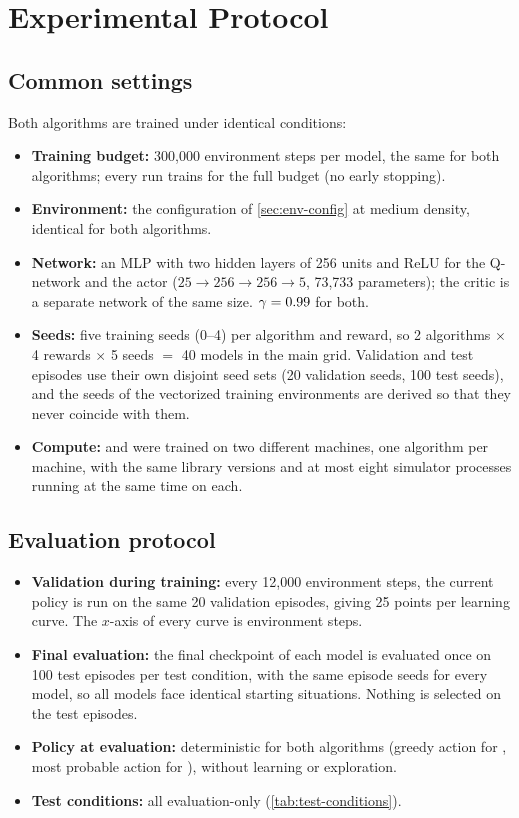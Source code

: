 \section{Experimental Protocol}\label{sec:protocol}

\subsection{Common settings}
Both algorithms are trained under identical conditions:
\begin{itemize}
  \item \textbf{Training budget:} 300,000 environment steps per model, the same for both algorithms; every run trains
        for the full budget (no early stopping).
  \item \textbf{Environment:} the configuration of \cref{sec:env-config} at medium density, identical for both
        algorithms.
  \item \textbf{Network:} an MLP with two hidden layers of 256 units and ReLU for the \ddqn{} Q-network and the \ppo{}
        actor ($25 \to 256 \to 256 \to 5$, 73,733 parameters); the \ppo{} critic is a separate network of the same size.
        $\gamma = 0.99$ for both.
  \item \textbf{Seeds:} five training seeds (0--4) per algorithm and reward, so 2 algorithms $\times$ 4 rewards
        $\times$ 5 seeds $=$ 40 models in the main grid. Validation and test episodes use their own disjoint seed sets
        (20 validation seeds, 100 test seeds), and the seeds of the vectorized training environments are derived so
        that they never coincide with them.
  \item \textbf{Compute:} \ddqn{} and \ppo{} were trained on two different machines, one algorithm per machine, with
        the same library versions and at most eight simulator processes running at the same time on each.
\end{itemize}

\subsection{Evaluation protocol}\label{sec:eval-protocol}
\begin{itemize}
  \item \textbf{Validation during training:} every 12,000 environment steps, the current policy is run on the same 20
        validation episodes, giving 25 points per learning curve. The $x$-axis of every curve is environment steps.
  \item \textbf{Final evaluation:} the final checkpoint of each model is evaluated once on 100 test episodes per test
        condition, with the same episode seeds for every model, so all models face identical starting situations.
        Nothing is selected on the test episodes.
  \item \textbf{Policy at evaluation:} deterministic for both algorithms (greedy action for \ddqn{}, most probable
        action for \ppo{}), without learning or exploration.
  \item \textbf{Test conditions:} all evaluation-only (\cref{tab:test-conditions}).
\end{itemize}

